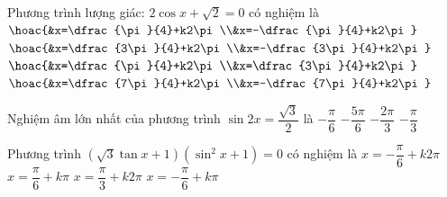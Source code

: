 \begin{ex}%
	Phương trình  lượng giác: $2\cos x+\sqrt{2}=0$ có nghiệm là
	\choice 
		 {$\hoac{&x=\dfrac{\pi}{4}+k2\pi\\&x=-\dfrac{\pi}{4}+k2\pi}$}
		{\True  $\hoac{&x=\dfrac{3\pi}{4}+k2\pi\\&x=-\dfrac{3\pi}{4}+k2\pi}$}
		{$\hoac{&x=\dfrac{\pi}{4}+k2\pi\\&x=\dfrac{3\pi}{4}+k2\pi}$} 
		{$\hoac{&x=\dfrac{7\pi}{4}+k2\pi\\&x=-\dfrac{7\pi}{4}+k2\pi}$} 
\end{ex}

\begin{ex}%
	Nghiệm âm lớn nhất của phương  trình $\sin 2x=\dfrac{\sqrt{3}}{2}$ là
	\choice 
		 {$-\dfrac{\pi}{6}$}
		{ $-\dfrac{5\pi}{6}$} 
		 {\True$-\dfrac{2\pi}{3}$}
		 {$-\dfrac{\pi}{3}$}
\end{ex}

\begin{ex}%
	Phương trình $\left( \sqrt{3}\tan x +1\right)\left(\sin^2x+1\right) =0$ có  nghiệm là
	\choice 
		{$x= -\dfrac{\pi}{6} +k2\pi$} 
		{$x= \dfrac{\pi}{6}  +k\pi$}
		{$x=  \dfrac{\pi}{3} +k2\pi$}
		{\True $x= -\dfrac{\pi}{6} +k\pi$} 
\end{ex}

